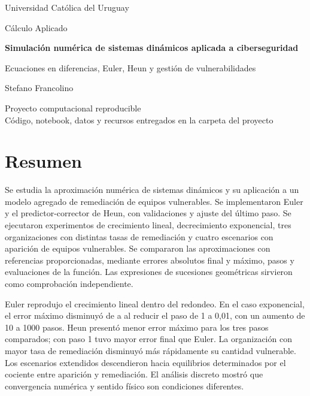 \documentclass[11pt,a4paper]{article}
\begin{document}
\hypersetup{pageanchor=false}
\begin{titlepage}
\centering
\vspace*{2cm}
{\Large Universidad Católica del Uruguay\par}
\vspace{1cm}
{\large Cálculo Aplicado\par}
\vspace{2cm}
{\LARGE\bfseries Simulación numérica de sistemas dinámicos aplicada a ciberseguridad\par}
\vspace{.7cm}
{\large Ecuaciones en diferencias, Euler, Heun y gestión de vulnerabilidades\par}
\vspace{2cm}
{\large Stefano Francolino\par}
\vfill
Proyecto computacional reproducible\\
Código, notebook, datos y recursos entregados en la carpeta del proyecto
\end{titlepage}
\hypersetup{pageanchor=true}
\section*{Resumen}
Se estudia la aproximación numérica de sistemas dinámicos y su aplicación a un modelo agregado de remediación de equipos vulnerables. Se implementaron Euler y el predictor-corrector de Heun, con validaciones y ajuste del último paso. Se ejecutaron experimentos de crecimiento lineal, decrecimiento exponencial, tres organizaciones con distintas tasas de remediación y cuatro escenarios con aparición de equipos vulnerables. Se compararon las aproximaciones con referencias proporcionadas, mediante errores absolutos final y máximo, pasos y evaluaciones de la función. Las expresiones de sucesiones geométricas sirvieron como comprobación independiente.

Euler reprodujo el crecimiento lineal dentro del redondeo. En el caso exponencial, el error máximo disminuyó de \ErrorEulerUno{} a \ErrorEulerPequeno{} al reducir el paso de 1 a 0,01, con un aumento de 10 a 1000 pasos. Heun presentó menor error máximo para los tres pasos comparados; con paso 1 tuvo mayor error final que Euler. La organización con mayor tasa de remediación disminuyó más rápidamente su cantidad vulnerable. Los escenarios extendidos descendieron hacia equilibrios determinados por el cociente entre aparición y remediación. El análisis discreto mostró que convergencia numérica y sentido físico son condiciones diferentes.
\end{document}
